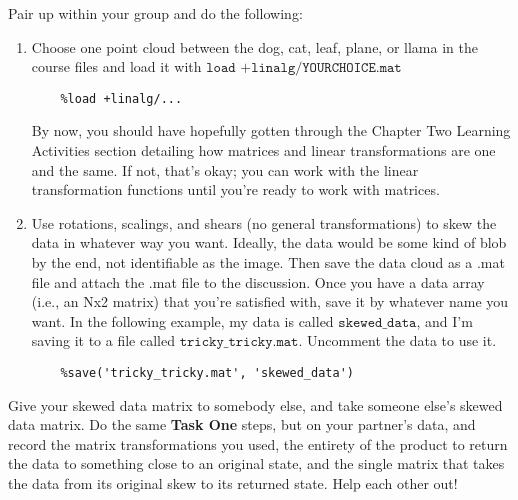 \documentclass{ximera}
\begin{document}
\begin{exploration}

Pair up within your group and do the following:
\begin{enumerate}
    \item Choose one point cloud between the dog, cat, leaf, plane, or llama in the course files and load it with
    $\texttt{load +linalg/YOURCHOICE.mat}$
    
    \begin{verbatim}
    %load +linalg/...
    \end{verbatim}

    By now, you should have hopefully gotten through the Chapter Two Learning Activities section detailing how matrices and linear transformations are one and the same. If not, that's okay; you can work with the linear transformation functions until you're ready to work with matrices.

    \item Use rotations, scalings, and shears (no general transformations) to skew the data in whatever way you want. Ideally, the data would be some kind of blob by the end, not identifiable as the image. Then save the data cloud as a .mat file and attach the .mat file to the discussion. Once you have a data array (i.e., an Nx2 matrix) that you're satisfied with, save it by whatever name you want. In the following example, my data is called $\texttt{skewed\_data}$, and I'm saving it to a file called $\texttt{tricky\_tricky.mat}$. Uncomment the data to use it.
    \begin{verbatim}
    %save('tricky_tricky.mat', 'skewed_data')
    \end{verbatim}
\end{enumerate}

Give your skewed data matrix to somebody else, and take someone else's skewed data matrix. Do the same \textbf{Task One} steps, but on your partner's data, and record the matrix transformations you used, the entirety of the product to return the data to something close to an original state, and the single matrix that takes the data from its original skew to its returned state. Help each other out!

\end{exploration}
\end{document}
